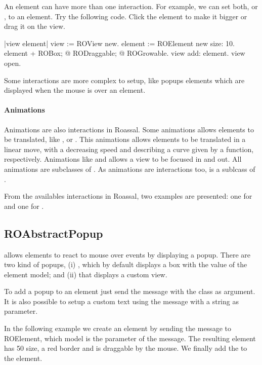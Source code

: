 \documentclass[a4paper,10pt,twoside]{book}
\begin{document}
An element can have more than one interaction. For example, we can set both,   or , to an element.
Try the following code. Click the element to make it bigger or drag it on the view.

\begin{code}{}
|view element|
view := ROView new.
element := ROElement new size: 10.
element 
	+ ROBox;
	@ RODraggable; 
	@ ROGrowable.
view add: element.
view open.
\end{code}


Some interactions are more complex to setup, like popups elements which are displayed when the mouse is over an element. 

\paragraph{Animations} Animations are also interactions in Roassal. Some animations allows elements to be translated, like ,  or . This animations allows elements to be translated in a linear move, with a decreasing speed and describing a curve given by a function, respectively. Animations like  and  allows a view to be focused in and out. All animations are subclasses of . As animations are interactions too,  is a sublcass of .

From the availables interactions in Roassal, two examples are presented: one for  and one for .

\subsection*{ROAbstractPopup}

 allows elements to react to mouse over events by displaying a popup. There are two kind of popups, (i) , which by default displays a box with the  value of the element model; and (ii)  that displays a custom view.

To add a popup to an element just send the  message with the  class as argument. It is also possible to setup a custom text using the  message with a string as parameter. 

In the following example we create an element by sending the  message to ROElement, which model is the parameter of the message. The resulting element has 50 size, a red border and is draggable by the mouse. We finally add the  to the element.
\end{document}
